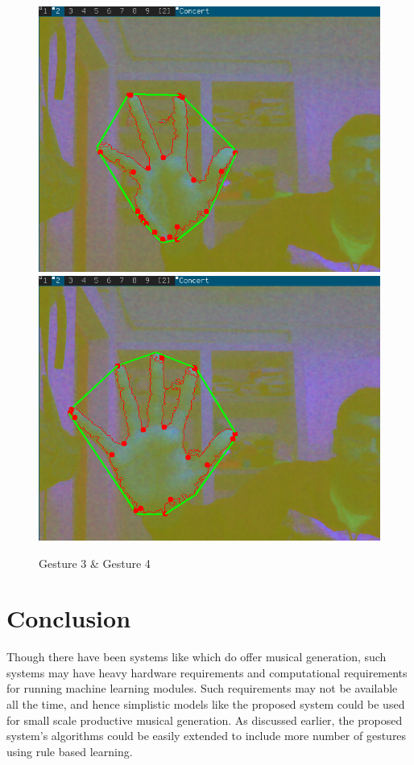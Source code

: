 \documentclass[letterpaper, 10 pt, twoside, conference]{ieeeconf}
\begin{document}
\begin{figure}[h!]
  \centering
  \includegraphics[width=0.4\columnwidth]{ges3.png}
  \includegraphics[width=0.4\columnwidth]{ges4.png}
  \caption{Gesture 3 \& Gesture 4}
  \label{Overall1}
\end{figure}

\section{Conclusion}
Though there have been systems like \cite{zatlab} which do offer musical generation,
such systems may have heavy hardware requirements and computational requirements
for running machine learning modules. Such requirements may not be available all the time,
and hence simplistic models like the proposed system could be used for small scale productive
musical generation. As discussed earlier, the proposed system's algorithms could be
easily extended to include more number of gestures using rule based learning.



\end{document}
